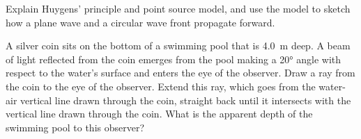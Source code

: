 \documentclass{../../ossphysics}
\begin{document}
\begin{questions}
  \vspace{\stretch1}
  
  
  \question Explain Huygens' principle and point source model, and use the model
  to sketch how a plane wave and a circular wave front propagate forward.
  \vspace{\stretch1}
  \newpage
  
  \question A silver coin sits on the bottom of a swimming pool that is
  \SI{4.0}{\metre} deep. A beam of light reflected from the coin emerges from
  the pool making a \ang{20} angle with respect to the water's surface and
  enters the
  eye of the observer. Draw a ray from the coin to the eye of the observer.
  Extend this ray, which goes from the water-air vertical line drawn through
  the coin, straight back until it intersects with the vertical line drawn
  through the coin. What is the apparent depth of the swimming pool to this
  observer?
  \vspace{\stretch1}
  

\end{questions}
\end{document}
